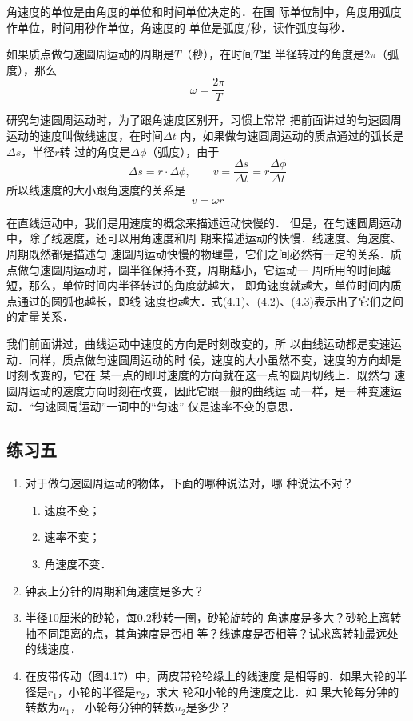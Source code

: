     角速度的单位是由角度的单位和时间单位决定的．在国
际单位制中，角度用弧度作单位，时间用秒作单位，角速度的
单位是弧度/秒，读作弧度每秒．

    如果质点做匀速圆周运动的周期是$T$（秒），在时间$T$里
半径转过的角度是$2\pi$（弧度），那么
\begin{equation}
\omega=\frac{2\pi}{T}
\end{equation}

    研究匀速圆周运动时，为了跟角速度区别开，习惯上常常
把前面讲过的匀速圆周运动的速度叫做线速度，在时间$\Delta t$
内，如果做匀速圆周运动的质点通过的弧长是$\Delta s$，半径$r$转
过的角度是$\Delta \phi$（弧度），由于
\[\Delta s=r\cdot \Delta \phi, \qquad v=\frac{\Delta s}{\Delta t}=r\frac{\Delta \phi}{\Delta t} \]
所以线速度的大小跟角速度的关系是
\begin{equation}
v=\omega r
\end{equation}

    在直线运动中，我们是用速度的概念来描述运动快慢的．
但是，在匀速圆周运动中，除了线速度，还可以用角速度和周
期来描述运动的快慢．线速度、角速度、周期既然都是描述匀
速圆周运动快慢的物理量，它们之间必然有一定的关系．质
点做匀速圆周运动时，圆半径保持不变，周期越小，它运动一
周所用的时间越短，那么，单位时间内半径转过的角度就越大，
即角速度就越大，单位时间内质点通过的圆弧也越长，即线
速度也越大．式(4.1)、(4.2)、(4.3)表示出了它们之间的定量关系．

    我们前面讲过，曲线运动中速度的方向是时刻改变的，所
以曲线运动都是变速运动．同样，质点做匀速圆周运动的时
候，速度的大小虽然不变，速度的方向却是时刻改变的，它在
某一点的即时速度的方向就在这一点的圆周切线上．既然匀
速圆周运动的速度方向时刻在改变，因此它跟一般的曲线运
动一样，是一种变速运动．“匀速圆周运动”一词中的“匀速”
仅是速率不变的意思．

\subsection*{练习五}
\begin{enumerate}
\item 对于做匀速圆周运动的物体，下面的哪种说法对，哪
种说法不对？
\begin{enumerate}
\item 速度不变；
\item 速率不变；
\item 角速度不变．
\end{enumerate}
\item 钟表上分针的周期和角速度是多大？
\item 半径10厘米的砂轮，每0.2秒转一圈，砂轮旋转的
角速度是多大？砂轮上离转抽不同距离的点，其角速度是否相
等？线速度是否相等？试求离转轴最远处的线速度．
\item 在皮带传动（图4.17）中，两皮带轮轮缘上的线速度
是相等的．如果大轮的半径是$r_1$，小轮的半径是$r_2$，求大
轮和小轮的角速度之比．如
果大轮每分钟的转数为$n_1$，
小轮每分钟的转数$n_2$是多少？
\end{enumerate}

